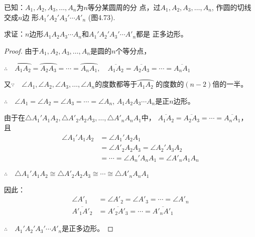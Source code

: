 已知：$A_1,A_2,A_3,\ldots,A_n$为$n$等分某圆周的分
点，过$A_1,A_2,A_3,\ldots,A_n$, 作圆的切线交成$n$边
形$A_1'A_2'A_3'\cdots A'_n$ (图4.73).

求证：$n$边形$A_1A_2A_3\cdots A_n$和$A_1'A_2'A_3'\cdots A'_n$都是
正多边形。

\begin{figure}[htp]
  \centering
{}
  \caption{}
\end{figure}

\begin{proof}
  由于$A_1,A_2,A_3,\ldots,A_n$是圆的$n$个等分点，

  $\therefore\quad  \wideparen{A_1A_2}=\wideparen{A_2A_3}=\cdots=\wideparen{A_nA_1},\quad 
  \overline{A_1A_2}=\overline{A_2A_3}=\cdots=\overline{A_nA_1}$

又$\because\quad \angle A_1,\angle A_2,\angle A_3,\ldots,\angle A_n$的度数都等于$\wideparen{A_1A_2}$
的度数的$(n-2)$倍的一半。

$\therefore\quad \angle A_1=\angle A_2=\angle A_3=\cdots=\angle A_n$, $A_1A_2A_3\cdots A_n$是正$n$边形。

由于在$\triangle A_1'A_1A_2,\triangle A'_2A_2A_3,\ldots,\triangle A'_nA_nA_1$中，
$\overline{A_1A_2}=\overline{A_2A_3}=\cdots=\overline{A_nA_1}$，
且
\begin{equation}
\begin{split}
  \angle A_1'A_1A_2&=\angle A_1'A_2A_1\\
  &=\angle A'_2A_2A_3=\angle A_2'A_3A_2\\
  &=\cdots=\angle A_n'A_nA_1=\angle A'_nA_1A_n 
\end{split}\tag{弦切角定理及其推论}
\end{equation}

$\therefore\quad \triangle A_1'A_1A_2\cong\triangle A'_2A_2A_3\cong\cdots\cong\triangle A'_nA_nA_1$

因此：
\[\begin{split}
  \angle A'_1&=\angle A'_2=\angle A'_3=\cdots=\angle A'_n\\
  \overline{A'_1A'_2}&=\overline{A'_2A'_3}=\cdots=\overline{A'_nA'_1}
\end{split}\]

$\therefore\quad A_1'A_2'A_3'\cdots A'_n$是正多边形。
\end{proof}

